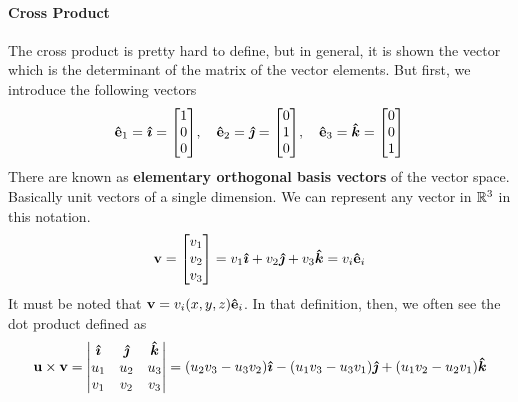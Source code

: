             \paragraph{Cross Product} 
                The cross product is pretty hard to define, but in general, it is shown the vector which is the determinant of the matrix of the vector elements. But first, we introduce the following vectors 
                \begin{equation}
					\vu{e}_1 = \ihat =\mqty[1\\0\\0],\quad 
					\vu{e}_2 = \jhat =\mqty[0\\1\\0],\quad
					\vu{e}_3 = \khat =\mqty[0\\0\\1]
                \end{equation}
				There are known as \textbf{elementary orthogonal basis vectors} of the vector space. Basically unit vectors of a single dimension. We can represent any vector in $\mathbb{R}^3$ in this notation.
                \begin{equation}
					\vb{v} = \mqty[v_1\\v_2\\v_3] = v_1\ihat + v_2\jhat + v_3\khat = v_i\vu{e}_i
                \end{equation}
				It must be noted that $\vb{v}= v_i(x,y,z)\vu{e}_i$. In that definition, then, we often see the dot product defined as
                \begin{equation}
                    \vb{u}\times\vb{v} = 
                    \abs{\mqty{
                        \ihat & \jhat  & \khat \\
                        u_1 & u_2 & u_3 \\
                        v_1 & v_2 & v_3 \\
                    }} = (u_2v_3-u_3v_2)\ihat-(u_1v_3-u_3v_1)\jhat+(u_1v_2-u_2v_1)\khat
                \end{equation}
